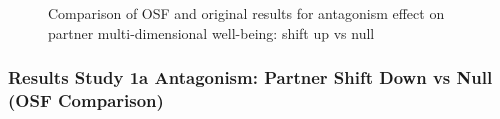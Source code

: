 \documentclass[
  singlecolumn]{article}
\begin{document}
\begin{figure}


\caption{\label{fig-results-antagonism-partner-up-comparison}Comparison
of OSF and original results for antagonism effect on partner
multi-dimensional well-being: shift up vs null}

\end{figure}%

\newpage{}

\subsubsection{Results Study 1a Antagonism: Partner Shift Down vs Null
(OSF
Comparison)}\label{results-study-1a-antagonism-partner-shift-down-vs-null-osf-comparison}
\end{document}
